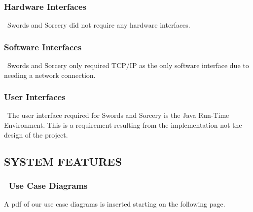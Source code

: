 \documentclass[twoside,letterpaper,pdftex]{article}
\begin{document}
\subsubsection[Hardware Interfaces]{\rmfamily\bfseries\color{black} Hardware Interfaces}
\hypertarget{RefHeading20859017292}{}{\color{black}
\foreignlanguage{english}{\ Swords and Sorcery did not require any hardware interfaces.}}

\subsubsection[Software Interfaces]{\rmfamily\bfseries\color{black} Software Interfaces}
\hypertarget{RefHeading21059017292}{}{\color{black}
\foreignlanguage{english}{\ Swords and Sorcery only required TCP/IP as the only software interface due to needing a network connection.}}

\subsubsection[User Interfaces]{\rmfamily\bfseries\color{black} User Interfaces}
\hypertarget{RefHeading21259017292}{}{\color{black}
\foreignlanguage{english}{\ The user interface required for Swords and Sorcery is the Java Run-Time Environment. This is a requirement resulting from the implementation not the design of the project. }}

\bigskip


\bigskip

\bigskip
\clearpage\setcounter{page}{1}\pagestyle{Convertiv}

\bigskip


\clearpage\setcounter{page}{1}\pagestyle{Convertv}
\subsection[SYSTEM FEATURES]{\rmfamily\bfseries\color{black} SYSTEM FEATURES}
\hypertarget{RefHeading21659017292}{}{\itshape\color{black}
}

\subsubsection[\ Use Case Diagrams]{\foreignlanguage{english}{\ Use Case Diagrams}}
\hypertarget{RefHeading21859017292}{}{\color{black}
A pdf of our use case diagrams is inserted starting on the following page.}




\bigskip
\end{document}
